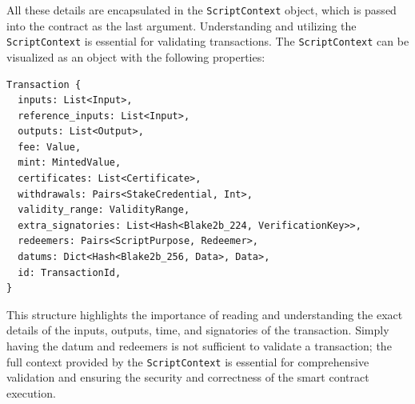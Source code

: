 All these details are encapsulated in the \texttt{ScriptContext} object, which is passed into the contract as the last argument. Understanding and utilizing the \texttt{ScriptContext} is essential for validating transactions. The \texttt{ScriptContext} can be visualized as an object with the following properties:

\begin{lstlisting}
Transaction {
  inputs: List<Input>,
  reference_inputs: List<Input>,
  outputs: List<Output>,
  fee: Value,
  mint: MintedValue,
  certificates: List<Certificate>,
  withdrawals: Pairs<StakeCredential, Int>,
  validity_range: ValidityRange,
  extra_signatories: List<Hash<Blake2b_224, VerificationKey>>,
  redeemers: Pairs<ScriptPurpose, Redeemer>,
  datums: Dict<Hash<Blake2b_256, Data>, Data>,
  id: TransactionId,
}
\end{lstlisting}

This structure highlights the importance of reading and understanding the exact details of the inputs, outputs, time, and signatories of the transaction. Simply having the datum and redeemers is not sufficient to validate a transaction; the full context provided by the \texttt{ScriptContext} is essential for comprehensive validation and ensuring the security and correctness of the smart contract execution.

